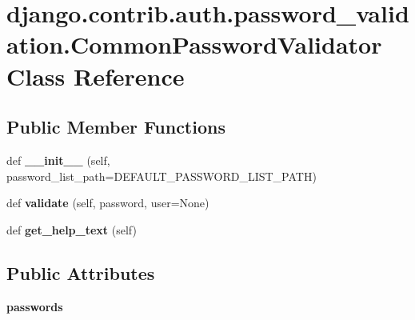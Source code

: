 \hypertarget{classdjango_1_1contrib_1_1auth_1_1password__validation_1_1_common_password_validator}{}\section{django.\+contrib.\+auth.\+password\+\_\+validation.\+Common\+Password\+Validator Class Reference}
\label{classdjango_1_1contrib_1_1auth_1_1password__validation_1_1_common_password_validator}
\subsection*{Public Member Functions}
\begin{DoxyCompactItemize}
\item 
\mbox{\label{classdjango_1_1contrib_1_1auth_1_1password__validation_1_1_common_password_validator_afefe54c7d1e3e39b47452a4e6bebc04f}} 
def {\bfseries \+\_\+\+\_\+init\+\_\+\+\_\+} (self, password\+\_\+list\+\_\+path=D\+E\+F\+A\+U\+L\+T\+\_\+\+P\+A\+S\+S\+W\+O\+R\+D\+\_\+\+L\+I\+S\+T\+\_\+\+P\+A\+TH)
\item 
\mbox{\label{classdjango_1_1contrib_1_1auth_1_1password__validation_1_1_common_password_validator_ad670a5661c5f1b063f72482a476ae212}} 
def {\bfseries validate} (self, password, user=None)
\item 
\mbox{\label{classdjango_1_1contrib_1_1auth_1_1password__validation_1_1_common_password_validator_aa500942d84582d7a86043c5ad6c365e2}} 
def {\bfseries get\+\_\+help\+\_\+text} (self)
\end{DoxyCompactItemize}
\subsection*{Public Attributes}
\begin{DoxyCompactItemize}
\item 
\mbox{\label{classdjango_1_1contrib_1_1auth_1_1password__validation_1_1_common_password_validator_a0e689cb86f95d091ccb2880edccd65be}} 
{\bfseries passwords}
\end{DoxyCompactItemize}
